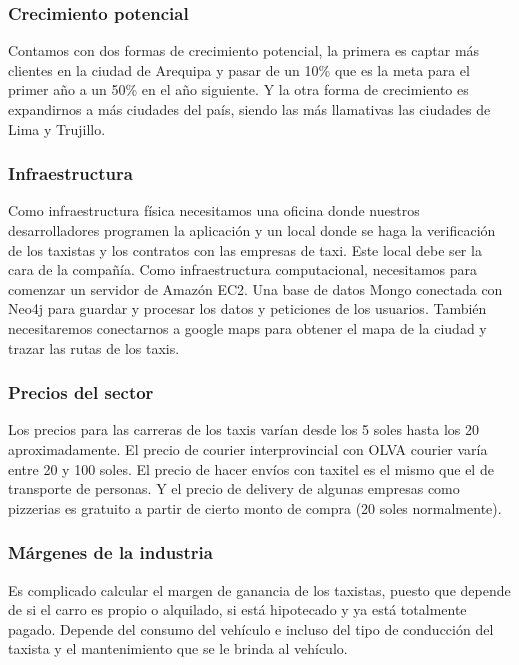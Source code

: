 \subsubsection{Crecimiento potencial}
Contamos con dos formas de crecimiento potencial, la primera es captar más clientes en la ciudad de Arequipa y pasar de un 10\% que es la meta para el primer año a un 50\% en el año siguiente. Y la otra forma de crecimiento es expandirnos a más ciudades del país, siendo las más llamativas las ciudades de Lima y Trujillo.

\subsubsection{Infraestructura}
Como infraestructura física necesitamos una oficina donde nuestros desarrolladores programen la aplicación y un local donde se haga la verificación de los taxistas y los contratos con las empresas de taxi. Este local debe ser la cara de la compañía.
Como infraestructura computacional, necesitamos para comenzar un servidor de Amazón EC2. Una base de datos Mongo conectada con Neo4j para guardar y procesar los datos y peticiones de los usuarios. También necesitaremos conectarnos a google maps para obtener el mapa de la ciudad y trazar las rutas de los taxis.

\subsubsection{Precios del sector}
Los precios para las carreras de los taxis varían desde los 5 soles hasta los 20 aproximadamente. El precio de courier interprovincial con OLVA courier varía entre 20 y 100 soles. El precio de hacer envíos con taxitel es el mismo que el de transporte de personas. Y el precio de delivery de algunas empresas como pizzerias es gratuito a partir de cierto monto de compra (20 soles normalmente).

\subsubsection{Márgenes de la industria}
Es complicado calcular el margen de ganancia de los taxistas, puesto que depende de si el carro es propio o alquilado, si está hipotecado y ya está totalmente pagado. Depende del consumo del vehículo e incluso del tipo de conducción del taxista y el mantenimiento que se le brinda al vehículo.


